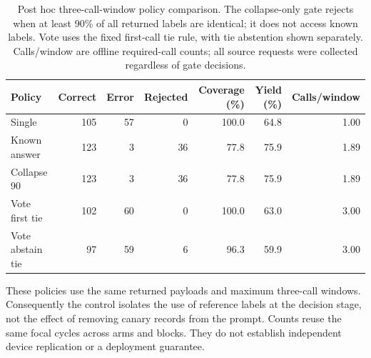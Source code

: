 \begin{table}[htbp]\centering\small
\caption{Post hoc three-call-window policy comparison. The collapse-only gate rejects when at least 90\% of all returned labels are identical; it does not access known labels. Vote uses the fixed first-call tie rule, with tie abstention shown separately. Calls/window are offline required-call counts; all source requests were collected regardless of gate decisions.}
\label{tab:canary_controls_posthoc}
\begin{tabular}{lrrrrrr}\toprule
Policy & Correct & Error & Rejected & Coverage (\%) & Yield (\%) & Calls/window \\\midrule
Single & 105 & 57 & 0 & 100.0 & 64.8 & 1.00 \\
Known answer & 123 & 3 & 36 & 77.8 & 75.9 & 1.89 \\
Collapse 90 & 123 & 3 & 36 & 77.8 & 75.9 & 1.89 \\
Vote first tie & 102 & 60 & 0 & 100.0 & 63.0 & 3.00 \\
Vote abstain tie & 97 & 59 & 6 & 96.3 & 59.9 & 3.00 \\
\bottomrule\end{tabular}\end{table}
These policies use the same returned payloads and maximum three-call windows. Consequently the control isolates the use of reference labels at the decision stage, not the effect of removing canary records from the prompt. Counts reuse the same focal cycles across arms and blocks. They do not establish independent device replication or a deployment guarantee.
